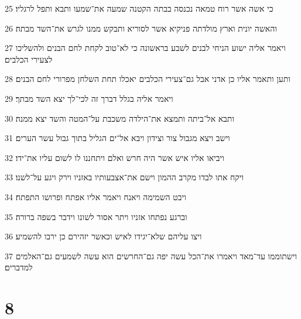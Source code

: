 \par 25 כי אשה אשר רוח טמאה נכנסה בבתה הקטנה שמעה את־שמעו ותבא ותפל לרגליו׃
\par 26 והאשה יונית וארץ מולדתה פניקיא אשר לסוריא ותבקש ממנו לגרש את־השד מבתה׃
\par 27 ויאמר אליה ישוע הניחי לבנים לשבע בראשונה כי לא־טוב לקחת לחם הבנים ולהשליכו לצעירי הכלבים׃
\par 28 ותען ותאמר אליו כן אדני אבל גם־צעירי הכלבים יאכלו תחת השלחן מפרורי לחם הבנים׃
\par 29 ויאמר אליה בגלל דברך זה לכי־לך יצא השד מבתך׃
\par 30 ותבא אל־ביתה ותמצא את־הילדה משכבת על־המטה והשד יצא ממנה׃
\par 31 וישב ויצא מגבול צור וצידון ויבא אל־ים הגליל בתוך גבול עשר הערים׃
\par 32 ויביאו אליו איש אשר היה חרש ואלם ויתחננו לו לשום עליו את־ידו׃
\par 33 ויקח אתו לבדו מקרב ההמון וישם את־אצבעותיו באזניו וירק ויגע על־לשנו׃
\par 34 ויבט השמימה ויאנח ויאמר אליו אפתח ופרושו התפתח׃
\par 35 וברגע נפתחו אזניו ויתר אסור לשונו וידבר בשפה ברורה׃
\par 36 ויצו עליהם שלא־יגידו לאיש וכאשר יזהירם כן ירבו להשמיע׃
\par 37 וישתוממו עד־מאד ויאמרו את־הכל עשה יפה גם־החרשים הוא עשה לשמעים גם־האלמים למדברים׃

\chapter{8}


